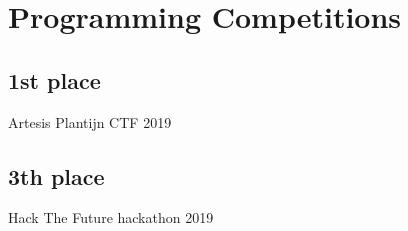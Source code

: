 \section{Programming Competiti\textcolor{mycolor}{ons}}
  \subsection{1st place}
    Artesis Plantijn CTF
    {\textcolor{mygrey}{\hspace*{\fill}2019}}
  \subsection{3th place}
    Hack The Future hackathon
    {\textcolor{mygrey}{\hspace*{\fill}2019}}
  
